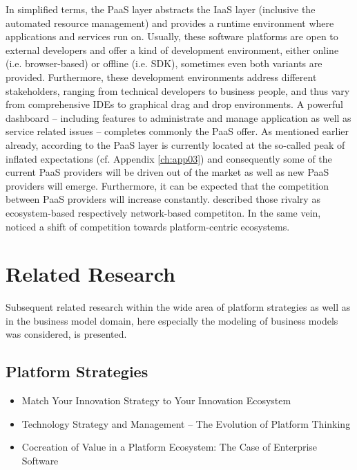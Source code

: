 In simplified terms, the \ac{PaaS} layer abstracts the \ac{IaaS} layer (inclusive the automated resource management) and provides a runtime environment where applications and services run on. Usually, these software platforms are open to external developers and offer a kind of development environment, either online (i.e. browser-based) or offline (i.e. \ac{SDK}), sometimes even both variants are provided. Furthermore, these development environments address different stakeholders, ranging from technical developers to business people, and thus vary from comprehensive \acp{IDE} to graphical drag and drop environments. A powerful dashboard -- including features to administrate and manage application as well as service related issues -- completes commonly the \ac{PaaS} offer.
As mentioned earlier already, according to \citet[p. 5]{Smith2012} the \ac{PaaS} layer is currently located at the so-called peak of inflated expectations (cf. Appendix \ref{ch:app03}) and consequently some of the current \ac{PaaS} providers will be driven out of the market as well as new \ac{PaaS} providers will emerge. Furthermore, it can be expected that the competition between \ac{PaaS} providers will increase constantly. \citet[pp. 117,128-129]{Iyer2010} described those rivalry as ecosystem-based respectively network-based competiton. In the same vein, \citet[pp. 675-676]{Tiwana2010} noticed a shift of competition towards platform-centric ecosystems.

\section{Related Research}\label{ch:tf:rw}

Subsequent related research within the wide area of platform strategies as well as in the business model domain, here especially the modeling of business models was considered, is presented.

\subsection{Platform Strategies}\label{ch:tf:rw:ps}

\begin{itemize}
	\item Match Your Innovation Strategy to Your Innovation Ecosystem \citep{Adner2006}
	\item Technology Strategy and Management -- The Evolution of Platform Thinking \citep{Cusumano2010}
	\item Cocreation of Value in a Platform Ecosystem: The Case of Enterprise Software \citep{Ceccagnoli2012}
\end{itemize}

